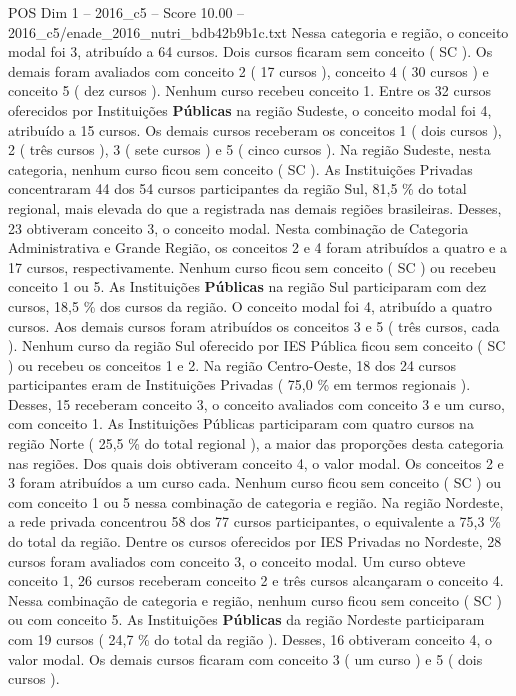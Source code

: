 \begin{textsample}{POS Dim 1 – 2016\_c5 – Score 10.00 – 2016\_c5/enade\_2016\_nutri\_bdb42b9b1c.txt}
Nessa categoria e região, o conceito modal foi 3, atribuído a 64 cursos.
Dois cursos ficaram sem conceito ( SC ).
Os demais foram avaliados com conceito 2 ( 17 cursos ), conceito 4 ( 30 cursos ) e conceito 5 ( dez cursos ).
Nenhum curso recebeu conceito 1.
Entre os 32 cursos oferecidos por Instituições \textbf{Públicas} na região Sudeste, o conceito modal foi 4, atribuído a 15 cursos.
Os demais cursos receberam os conceitos 1 ( dois cursos ), 2 ( três cursos ), 3 ( sete cursos ) e 5 ( cinco cursos ).
Na região Sudeste, nesta categoria, nenhum curso ficou sem conceito ( SC ).
As Instituições Privadas concentraram 44 dos 54 cursos participantes da região Sul, 81,5 \% do total regional, mais elevada do que a registrada nas demais regiões brasileiras.
Desses, 23 obtiveram conceito 3, o conceito modal.
Nesta combinação de Categoria Administrativa e Grande Região, os conceitos 2 e 4 foram atribuídos a quatro e a 17 cursos, respectivamente.
Nenhum curso ficou sem conceito ( SC ) ou recebeu conceito 1 ou 5.
As Instituições \textbf{Públicas} na região Sul participaram com dez cursos, 18,5 \% dos cursos da região.
O conceito modal foi 4, atribuído a quatro cursos.
Aos demais cursos foram atribuídos os conceitos 3 e 5 ( três cursos, cada ).
Nenhum curso da região Sul oferecido por IES Pública ficou sem conceito ( SC ) ou recebeu os conceitos 1 e 2.
Na região Centro-Oeste, 18 dos 24 cursos participantes eram de Instituições Privadas ( 75,0 \% em termos regionais ).
Desses, 15 receberam conceito 3, o conceito avaliados com conceito 3 e um curso, com conceito 1.
As Instituições Públicas participaram com quatro cursos na região Norte ( 25,5 \% do total regional ), a maior das proporções desta categoria nas regiões.
Dos quais dois obtiveram conceito 4, o valor modal.
Os conceitos 2 e 3 foram atribuídos a um curso cada.
Nenhum curso ficou sem conceito ( SC ) ou com conceito 1 ou 5 nessa combinação de categoria e região.
Na região Nordeste, a rede privada concentrou 58 dos 77 cursos participantes, o equivalente a 75,3 \% do total da região.
Dentre os cursos oferecidos por IES Privadas no Nordeste, 28 cursos foram avaliados com conceito 3, o conceito modal.
Um curso obteve conceito 1, 26 cursos receberam conceito 2 e três cursos alcançaram o conceito 4.
Nessa combinação de categoria e região, nenhum curso ficou sem conceito ( SC ) ou com conceito 5.
As Instituições \textbf{Públicas} da região Nordeste participaram com 19 cursos ( 24,7 \% do total da região ).
Desses, 16 obtiveram conceito 4, o valor modal.
Os demais cursos ficaram com conceito 3 ( um curso ) e 5 ( dois cursos ).

\end{textsample}
